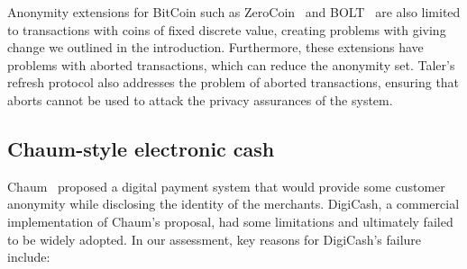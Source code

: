 \documentclass{llncs}
\begin{document}
Anonymity extensions for BitCoin such as ZeroCoin~\cite{miers2013zerocoin}
and BOLT~\cite{BOLT} are also limited to transactions with coins
of fixed discrete value, creating problems with giving change we
outlined in the introduction.  Furthermore, these extensions have
problems with aborted transactions, which can reduce the anonymity
set.  Taler's refresh protocol also addresses the problem of aborted
transactions, ensuring that aborts cannot be used to attack the
privacy assurances of the system.


\subsection{Chaum-style electronic cash}

Chaum~\cite{chaum1983blind} proposed a digital payment system that
would provide some customer anonymity while disclosing the identity of
the merchants.  DigiCash, a commercial implementation of Chaum's
proposal, had some limitations and ultimately failed to be widely
adopted.  In our assessment, key reasons for DigiCash's failure
include:
\end{document}

